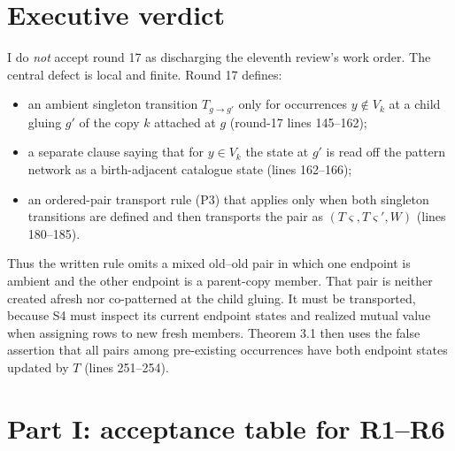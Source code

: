 \documentclass[11pt]{article}
\begin{document}
\section{Executive verdict}

I do \emph{not} accept round 17 as discharging the eleventh review's work order.  The central defect is local and finite.  Round 17 defines:
\begin{itemize}
  \item an ambient singleton transition $T_{g\to g'}$ only for occurrences $y\notin V_k$ at a child gluing $g'$ of the copy $k$ attached at $g$ (round-17 lines 145--162);
  \item a separate clause saying that for $y\in V_k$ the state at $g'$ is read off the pattern network as a birth-adjacent catalogue state (lines 162--166);
  \item an ordered-pair transport rule (P3) that applies only when both singleton transitions are defined and then transports the pair as $(T\varsigma,T\varsigma',W)$ (lines 180--185).
\end{itemize}
Thus the written rule omits a mixed old--old pair in which one endpoint is ambient and the other endpoint is a parent-copy member.  That pair is neither created afresh nor co-patterned at the child gluing.  It must be transported, because S4 must inspect its current endpoint states and realized mutual value when assigning rows to new fresh members.  Theorem 3.1 then uses the false assertion that all pairs among pre-existing occurrences have both endpoint states updated by $T$ (lines 251--254).

\section{Part I: acceptance table for R1--R6}
\end{document}
